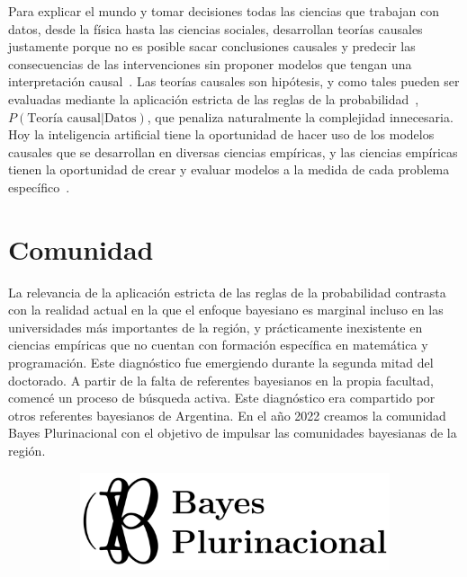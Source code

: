 \documentclass[a4paper,11pt]{book}
\theoremstyle{definition}
\begin{document}
%

Para explicar el mundo y tomar decisiones todas las ciencias que trabajan con datos, desde la f\'isica hasta las ciencias sociales, desarrollan teor\'ias causales justamente porque no es posible sacar conclusiones causales y predecir las consecuencias de las intervenciones sin proponer modelos que tengan una interpretaci\'on causal~\cite{pearl2009-causality, peters2017-causalInference}.
%
Las teor\'ias causales son hip\'otesis, y como tales pueden ser evaluadas mediante la aplicaci\'on estricta de las reglas de la probabilidad~\cite{winn2012-causality}, $P(\text{Teor\'ia causal}|\text{Datos})$, que penaliza naturalmente la complejidad innecesaria.
%
Hoy la inteligencia artificial tiene la oportunidad de hacer uso de los modelos causales que se desarrollan en diversas ciencias emp\'iricas, y las ciencias emp\'iricas tienen la oportunidad de crear y evaluar modelos a la medida de cada problema espec\'ifico~\cite{murphy-pmlBook1,murphy-pmlBook2, Bishop2013, Bishop2006}.


\section{Comunidad}

La relevancia de la aplicaci\'on estricta de las reglas de la probabilidad contrasta con la realidad actual en la que el enfoque bayesiano es marginal incluso en las universidades m\'as importantes de la regi\'on, y pr\'acticamente inexistente en ciencias emp\'iricas que no cuentan con formaci\'on espec\'ifica en matem\'atica y programaci\'on.
%
Este diagn\'ostico fue emergiendo durante la segunda mitad del doctorado.
%
A partir de la falta de referentes bayesianos en la propia facultad, comenc\'e un proceso de b\'usqueda activa.
%
Este diagn\'ostico era compartido por otros referentes bayesianos de Argentina.
%
En el a\~no 2022 creamos la comunidad Bayes Plurinacional con el objetivo de impulsar las comunidades bayesianas de la regi\'on.
%
\begin{figure}[ht!]
\centering
  \begin{subfigure}[b]{0.45\textwidth}
  \includegraphics[page=1,width=\textwidth]{static/BP.pdf}
  \end{subfigure}
\end{figure}
\end{document}
